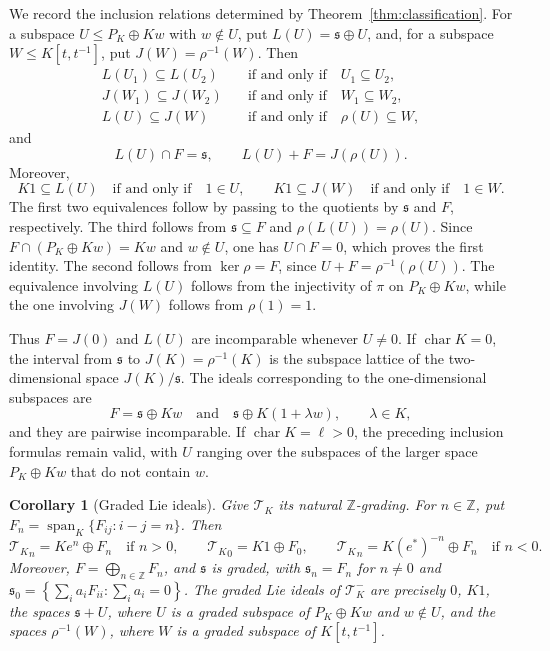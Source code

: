 \documentclass[11pt]{article}
\numberwithin{equation}{section}
\theoremstyle{plain}
\newtheorem{corollary}[theorem]{Corollary}
\theoremstyle{definition}
\numberwithin{equation}{section}
\newcommand{\T}{\mathscr T_K}
\newcommand{\Span}{\operatorname{span}_K}
\begin{document}
We record the inclusion relations determined by
Theorem~\ref{thm:classification}. For a subspace
$U\leq P_K\oplus Kw$ with $w\notin U$, put $L(U)=\mathfrak s\oplus U$, and, for a subspace $W\leq K[t,t^{-1}]$, put $J(W)=\rho^{-1}(W)$.
Then
\begin{align*}
L(U_1)\subseteq L(U_2)
&\quad\text{if and only if}\quad U_1\subseteq U_2,\\
J(W_1)\subseteq J(W_2)
&\quad\text{if and only if}\quad W_1\subseteq W_2,\\
L(U)\subseteq J(W)
&\quad\text{if and only if}\quad \rho(U)\subseteq W,
\end{align*}
and
$$
L(U)\cap F=\mathfrak s,\qquad
L(U)+F=J(\rho(U)).
$$
Moreover,
$$
K1\subseteq L(U)
\quad\text{if and only if}\quad
1\in U,
\qquad
K1\subseteq J(W)
\quad\text{if and only if}\quad
1\in W.
$$
The first two equivalences follow by passing to the quotients by
$\mathfrak s$ and $F$, respectively. The third follows from
$\mathfrak s\subseteq F$ and $\rho(L(U))=\rho(U)$. Since $F\cap(P_K\oplus Kw)=Kw$ and $w\notin U$, one has $U\cap F=0$, which proves the first identity.
The second follows from $\ker\rho=F$, since
$U+F=\rho^{-1}(\rho(U))$. The equivalence involving $L(U)$ follows
from the injectivity of $\pi$ on $P_K\oplus Kw$, while the one
involving $J(W)$ follows from $\rho(1)=1$.

Thus $F=J(0)$ and $L(U)$ are incomparable whenever $U\neq0$. If
$\operatorname{char}K=0$, the interval from $\mathfrak s$ to
$J(K)=\rho^{-1}(K)$ is the subspace lattice of the two-dimensional
space $J(K)/\mathfrak s$. The ideals corresponding to the
one-dimensional subspaces are
$$
F=\mathfrak s\oplus Kw
\quad\text{and}\quad
\mathfrak s\oplus K(1+\lambda w),
\qquad \lambda\in K,
$$
and they are pairwise incomparable. If $\operatorname{char}K=\ell>0$,
the preceding inclusion formulas remain valid, with $U$ ranging over
the subspaces of the larger space $P_K\oplus Kw$ that do not contain
$w$.

\begin{corollary}[Graded Lie ideals]\label{cor:graded-lie-ideals}
Give $\T$ its natural $\mathbb Z$-grading. For $n\in\mathbb Z$, put $F_n=\Span\{F_{ij}:i-j=n\}$. Then
$$
{\T}_n=K e^n\oplus F_n\quad\text{if }n>0,\qquad
{\T}_0=K1\oplus F_0,\qquad
{\T}_n=K(e^*)^{-n}\oplus F_n\quad\text{if }n<0.
$$
Moreover, $F=\bigoplus_{n\in\mathbb Z}F_n$, and $\mathfrak s$ is graded, with $\mathfrak s_n=F_n$ for $n\neq0$ and $\mathfrak s_0=\left\{\sum_i a_iF_{ii}:\sum_i a_i=0\right\}$. The graded Lie ideals of $\T^-$ are precisely $0$, $K1$, the spaces $\mathfrak s+U$, where $U$ is a graded subspace of $P_K\oplus Kw$ and $w\notin U$, and the spaces $\rho^{-1}(W)$, where $W$ is a graded subspace of $K[t,t^{-1}]$.
\end{corollary}
\end{document}
